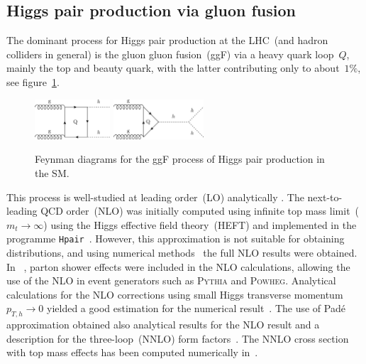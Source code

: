 \documentclass[12pt]{article}
\begin{document}
 \subsection*{Higgs pair production via gluon fusion}
\par The dominant process for Higgs pair production at the LHC~(and hadron colliders in general) is the gluon gluon fusion~(ggF) via a heavy quark loop~$Q$, mainly the top and beauty quark, with the latter contributing only to about~$1\%$, see figure~\ref{fig_ggf_sm}.
 \begin{figure}[!htpb]
 	\centering
 	\includegraphics[width = 0.25\textwidth]{ggfbox}
 	\hspace{0.3 cm}
 	\includegraphics[width = 0.3\textwidth]{ggftri}
 	\caption{Feynman diagrams for the ggF process of Higgs pair production in the SM.} %
 	\label{fig_ggf_sm}
 \end{figure}
  This process is well-studied at leading order~(LO) analytically \cite{EBOLI1987269,GLOVER1988282,DICUS1988457,Plehn:1996wb}. The next-to-leading  QCD order~(NLO)   was initially computed using infinite top mass limit~($m_t \to \infty$) using the Higgs effective field theory~(HEFT) and implemented in the programme \texttt{Hpair}~\cite{Dawson:1998py}. However, this approximation is not suitable for obtaining distributions, and using numerical methods~\cite{Borowka:2016ypz,Borowka:2016ehy,Baglio:2018lrj} the full NLO results were obtained. In ~\cite{Heinrich:2019bkc}, parton shower effects were included in the NLO calculations, allowing the use of the NLO in event generators such as \textsc{Pythia} and \textsc{Powheg}. Analytical calculations for the NLO corrections using small Higgs transverse momentum~$p_{T,h} \to 0$ yielded a good estimation for the numerical result~\cite{Bonciani:2018omm}. The use of Pad\'e approximation obtained also analytical results for the NLO result and a description for the three-loop~(NNLO) form factors~\cite{Davies:2019nhm}. The NNLO cross section with top mass effects has been computed numerically in~\cite{Grazzini:2018bsd}.
\end{document}
